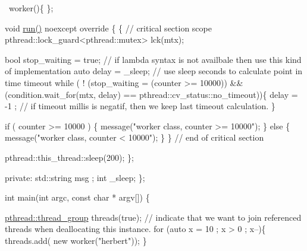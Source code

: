 \begin{DoxyPre}{\ttfamily   ~worker()\{
  \};}\end{DoxyPre}



\begin{DoxyPre}{\ttfamily   void \hyperlink{classpthread_1_1runnable_a4e0ce933602df83c096a37974ebedf84}{run()} noexcept override \{
    \{ // critical section scope
      pthread::lock\_guard<pthread::mutex> lck(mtx);}\end{DoxyPre}



\begin{DoxyPre}{\ttfamily       bool stop\_waiting = true; // if lambda syntax is not availbale then use this kind of implementation
      auto delay = \_sleep; // use sleep seconds to calculate point in time timeout
      while ( ! (stop\_waiting = (counter >= 10000)) \&\& (condition.wait\_for(mtx, delay) == pthread::cv\_status::no\_timeout))\{
        delay = -1 ; // if timeout millis is negatif, then we keep last timeout calculation.
      \}}\end{DoxyPre}



\begin{DoxyPre}{\ttfamily       if ( counter >= 10000 ) \{
        message("worker class, counter >= 10000");
      \} else \{
        message("worker class, counter < 10000");
      \}
    \} // end of critical section}\end{DoxyPre}



\begin{DoxyPre}{\ttfamily     pthread::this\_thread::sleep(200);
  \};}\end{DoxyPre}



\begin{DoxyPre}{\ttfamily private:
  std::string    msg ;
  int            \_sleep;
\};}\end{DoxyPre}



\begin{DoxyPre}{\ttfamily int main(int argc, const char * argv[]) \{}\end{DoxyPre}



\begin{DoxyPre}{\ttfamily   \hyperlink{classpthread_1_1thread__group}{pthread::thread\_group} threads(true); // indicate that we want to join referenced threads when deallocating this instance.
  for (auto x = 10 ; x > 0 ; x--)\{
    threads.add( new worker("herbert"));
  \}}\end{DoxyPre}



